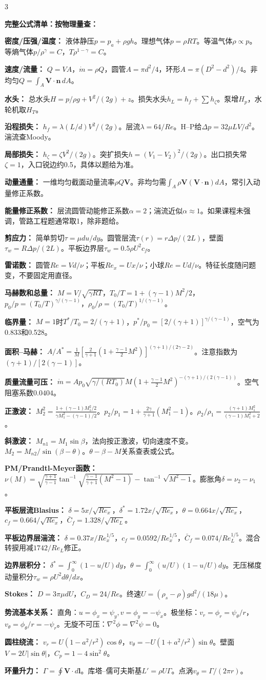 \documentclass[a4paper]{article}
\newcommand{\sect}[1]{\par{\bfseries\color{Q}#1：}}
\begin{document}
\begin{multicols}{3}
{\sect{完整公式清单：按物理量查}
\sect{密度/压强/温度}
液体静压$p=p_a+\rho gh$。理想气体$p=\rho RT$。等温气体$\rho\propto p$。等熵气体$p/\rho^\gamma=C$，$T\rho^{1-\gamma}=C$。
\sect{速度/流量}
$Q=VA$，$\dot m=\rho Q$，圆管$A=\pi d^2/4$，环形$A=\pi(D^2-d^2)/4$。非均匀$Q=\int_A\bm V\cdot\bm n\,dA$。
\sect{水头}
总水头$H=p/\rho g+V^2/(2g)+z$。损失水头$h_L=h_f+\sum h_\zeta$。泵增$H_p$，水轮机取$H_T$。
\sect{沿程损失}
$h_f=\lambda(L/d)V^2/(2g)$。层流$\lambda=64/Re$。H--P给$\Delta p=32\mu LV/d^2$。湍流查Moody。
\sect{局部损失}
$h_\zeta=\zeta V^2/(2g)$。突扩损失$h=(V_1-V_2)^2/(2g)$。出口损失常$\zeta=1$，入口锐边约0.5，具体以题给为准。
\sect{动量通量}
一维均匀截面动量流率$\rho Q\bm V$。非均匀需$\int_A\rho\bm V(\bm V\cdot\bm n)dA$，常引入动量修正系数。
\sect{能量修正系数}
层流圆管动能修正系数$\alpha=2$；湍流近似$\alpha\approx1$。如果课程未强调，管路工程题通常取1，除非题给。
\sect{剪应力}
简单剪切$\tau=\mu du/dy$。圆管层流$\tau(r)=r\Delta p/(2L)$，壁面$\tau_w=R\Delta p/(2L)$。平板边界层$\tau_w=0.5\rho U^2 c_f$。
\sect{雷诺数}
圆管$Re=Vd/\nu$；平板$Re_x=Ux/\nu$；小球$Re=Ud/\nu$。特征长度随问题变，不要固定用直径。
\sect{马赫数和总量}
$M=V/\sqrt{\gamma RT}$，$T_0/T=1+(\gamma-1)M^2/2$，$p_0/p=(T_0/T)^{\gamma/(\gamma-1)}$，$\rho_0/\rho=(T_0/T)^{1/(\gamma-1)}$。
\sect{临界量}
$M=1$时$T^*/T_0=2/(\gamma+1)$，$p^*/p_0=[2/(\gamma+1)]^{\gamma/(\gamma-1)}$，空气为0.833和0.528。
\sect{面积--马赫}
$A/A^*=\frac1M[\frac{2}{\gamma+1}(1+\frac{\gamma-1}{2}M^2)]^{(\gamma+1)/(2\gamma-2)}$。注意指数为$(\gamma+1)/[2(\gamma-1)]$。
\sect{质量流量可压}
$\dot m=A p_0\sqrt{\gamma/(RT_0)}M(1+\frac{\gamma-1}{2}M^2)^{-(\gamma+1)/(2(\gamma-1))}$。空气阻塞系数$0.0404$。
\sect{正激波}
$M_2^2=\frac{1+(\gamma-1)M_1^2/2}{\gamma M_1^2-(\gamma-1)/2}$。$p_2/p_1=1+\frac{2\gamma}{\gamma+1}(M_1^2-1)$。$\rho_2/\rho_1=\frac{(\gamma+1)M_1^2}{(\gamma-1)M_1^2+2}$。
\sect{斜激波}
$M_{n1}=M_1\sin\beta$，法向按正激波，切向速度不变。$M_2=M_{n2}/\sin(\beta-\theta)$。$\theta-\beta-M$关系查表或公式。
\sect{PM/Prandtl-Meyer函数}
$\nu(M)=\sqrt{\frac{\gamma+1}{\gamma-1}}\tan^{-1}\sqrt{\frac{\gamma-1}{\gamma+1}(M^2-1)}-\tan^{-1}\sqrt{M^2-1}$。膨胀角$\delta=\nu_2-\nu_1$。
\sect{平板层流Blasius}
$\delta=5x/\sqrt{Re_x}$，$\delta^*=1.72x/\sqrt{Re_x}$，$\theta=0.664x/\sqrt{Re_x}$，$c_f=0.664/\sqrt{Re_x}$，$\bar C_f=1.328/\sqrt{Re_L}$。
\sect{平板边界层湍流}
$\delta=0.37x/Re_x^{1/5}$，$c_f=0.0592/Re_x^{1/5}$，$\bar C_f=0.074/Re_L^{1/5}$。混合转捩用减$1742/Re_L$修正。
\sect{边界层积分}
$\delta^*=\int_0^\infty(1-u/U)dy$，$\theta=\int_0^\infty(u/U)(1-u/U)dy$。无压梯度动量积分$\tau_w=\rho U^2d\theta/dx$。
\sect{Stokes}
$D=3\pi\mu dU$，$C_D=24/Re$。终速$U=(\rho_s-\rho)gd^2/(18\mu)$。
\sect{势流基本关系}
直角：$u=\phi_x=\psi_y,v=\phi_y=-\psi_x$。极坐标：$v_r=\phi_r=\psi_\theta/r$，$v_\theta=\phi_\theta/r=-\psi_r$。无旋不可压：$\nabla^2\phi=\nabla^2\psi=0$。
\sect{圆柱绕流}
$v_r=U(1-a^2/r^2)\cos\theta$，$v_\theta=-U(1+a^2/r^2)\sin\theta$。壁面$V=2U|\sin\theta|$，$C_p=1-4\sin^2\theta$。
\sect{环量升力}
$\Gamma=\oint\bm V\cdot d\bm l$。库塔--儒可夫斯基$L'=\rho U\Gamma$。点涡$v_\theta=\Gamma/(2\pi r)$。

}
\end{multicols}
\end{document}
